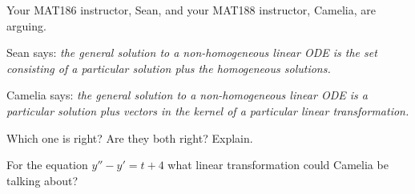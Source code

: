 \documentclass{workbook}
\begin{document}
\begin{slide}
	\question
	Your MAT186 instructor, Sean, and your MAT188 instructor, Camelia, are 
	arguing.

	Sean says: \emph{the general solution to a non-homogeneous linear ODE is 
	the set consisting of a particular solution plus the homogeneous solutions.}

	Camelia says: \emph{the general solution to a non-homogeneous linear ODE
	is a particular solution plus vectors in the kernel of a particular linear transformation.}

	\bigskip

	\begin{parts}
		\item Which one is right? Are they both right? Explain.
		\item For the equation $y''-y'=t+4$ what linear transformation could Camelia be talking about?
	\end{parts}

\end{slide}
\end{document}
